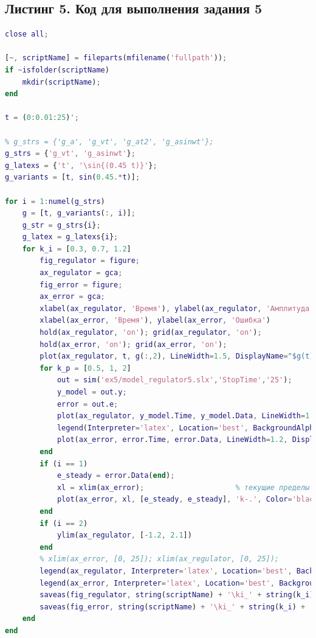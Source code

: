 \documentclass[a4paper]{article}
\begin{document}
\subsection*{Листинг 5. Код для выполнения задания 5}
\begin{lstlisting}[caption={Код для построения графиков для задания 5}, language=matlab]
% clear all;
close all;

[~, scriptName] = fileparts(mfilename('fullpath'));
if ~isfolder(scriptName)
    mkdir(scriptName);
end

t = (0:0.01:25)';

% g_strs = {'g_a', 'g_vt', 'g_at2', 'g_asinwt'};
g_strs = {'g_vt', 'g_asinwt'};
g_latexs = {'t', '\sin{(0.45 t)}'};
g_variants = [t, sin(0.45.*t)];

for i = 1:numel(g_strs)
    g = [t, g_variants(:, i)];
    g_str = g_strs{i};
    g_latex = g_latexs{i};
    for k_i = [0.3, 0.7, 1.2]
        fig_regulator = figure;
        ax_regulator = gca;
        fig_error = figure;
        ax_error = gca;
        xlabel(ax_regulator, 'Время'), ylabel(ax_regulator, 'Амплитуда')
        xlabel(ax_error, 'Время'), ylabel(ax_error, 'Ошибка')
        hold(ax_regulator, 'on'); grid(ax_regulator, 'on');
        hold(ax_error, 'on'); grid(ax_error, 'on');
        plot(ax_regulator, t, g(:,2), LineWidth=1.5, DisplayName="$g(t) = " + g_latex + "$", Color='black')
        for k_p = [0.5, 1, 2]
            out = sim('ex5/model_regulator5.slx','StopTime','25');
            y_model = out.y;
            error = out.e;
            plot(ax_regulator, y_model.Time, y_model.Data, LineWidth=1.2, DisplayName="$y_{zamk}(t), k_p = " + string(k_p) + "$")
            legend(Interpreter='latex', Location='best', BackgroundAlpha=.3, FontSize=10, FontName='Computer Modern')
            plot(ax_error, error.Time, error.Data, LineWidth=1.2, DisplayName="$e(t), k_p = " + string(k_p) + "$")
        end
        if (i == 1)
            e_steady = error.Data(end);
            xl = xlim(ax_error);                     % текущие пределы по X - вектор [x_min, x_max]
            plot(ax_error, xl, [e_steady, e_steady], 'k-.', Color='black', DisplayName="$e_{end} = " + string(e_steady) + "$");     % два значения y0 для двух точек
        end
        if (i == 2)
            ylim(ax_regulator, [-1.2, 2.1])
        end
        % xlim(ax_error, [0, 25]); xlim(ax_regulator, [0, 25]); 
        legend(ax_regulator, Interpreter='latex', Location='best', BackgroundAlpha=.3, FontSize=12, FontName='Computer Modern')
        legend(ax_error, Interpreter='latex', Location='best', BackgroundAlpha=.3, FontSize=12, FontName='Computer Modern')
        saveas(fig_regulator, string(scriptName) + '\ki_' + string(k_i) + '_' + g_str + '.eps', 'epsc')
        saveas(fig_error, string(scriptName) + '\ki_' + string(k_i) + '_' + g_str + '_error.eps', 'epsc')
    end
end
\end{lstlisting}
\end{document}
